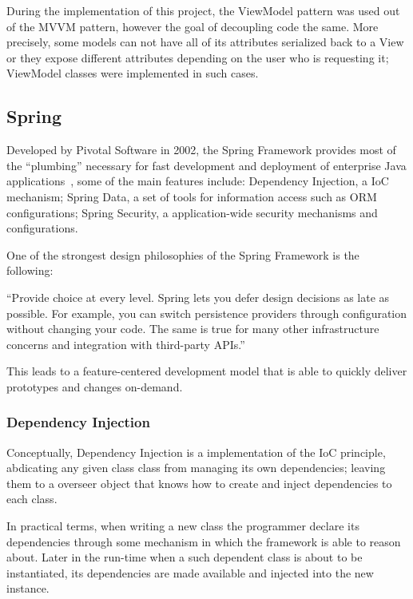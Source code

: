 During the implementation of this project, the ViewModel pattern was used out of the \gls{MVVM} pattern, however the goal of decoupling code the same. More precisely, some models can not have all of its attributes serialized back to a View or they expose different attributes depending on the user who is requesting it; ViewModel classes were implemented in such cases.

\subsection{Spring}\label{concept:spring}
Developed by Pivotal Software in 2002, the Spring Framework provides most of the ``plumbing'' necessary for fast development and deployment of enterprise Java applications~\cite{springdocs}, some of the main features include: Dependency Injection, a \gls{IoC} mechanism; Spring Data, a set of tools for information access such as \gls{ORM} configurations; Spring Security, a application-wide security mechanisms and configurations.

One of the strongest design philosophies of the Spring Framework is the following:
\begin{displayquote}
``Provide choice at every level. Spring lets you defer design decisions as late as possible. For example, you can switch persistence providers through configuration without changing your code. The same is true for many other infrastructure concerns and integration with third-party \gls{API}s.''~\cite{springdocs}
\end{displayquote}
This leads to a feature-centered development model that is able to quickly deliver prototypes and changes on-demand.

\subsubsection{Dependency Injection}
Conceptually, Dependency Injection is a implementation of the \gls{IoC} principle, abdicating any given class class from managing its own dependencies; leaving them to a overseer object that knows how to create and inject dependencies to each class\cite{inversion}.

In practical terms, when writing a new class the programmer declare its dependencies through some mechanism in which the framework is able to reason about. Later in the run-time when a such dependent class is about to be instantiated, its dependencies are made available and injected into the new instance.

